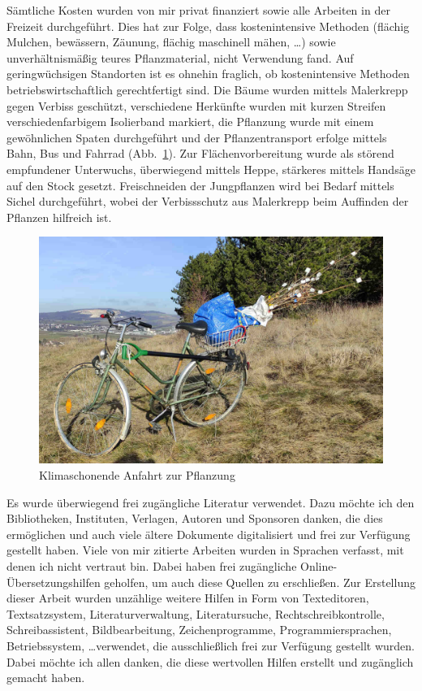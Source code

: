 \documentclass[twocolumn]{scrartcl}
\begin{document}
Sämtliche Kosten wurden von mir privat finanziert sowie alle Arbeiten
in der Freizeit durchgeführt. Dies hat zur Folge, dass kostenintensive
Methoden (flächig Mulchen, bewässern, Zäunung, flächig maschinell
mähen, \dots) sowie unverhältnismäßig teures Pflanzmaterial, nicht
Verwendung fand. Auf geringwüchsigen Standorten ist es ohnehin
fraglich, ob kostenintensive Methoden betriebswirtschaftlich
gerechtfertigt sind. Die Bäume wurden mittels Malerkrepp gegen Verbiss
geschützt, verschiedene Herkünfte wurden mit kurzen Streifen
verschiedenfarbigem Isolierband markiert, die Pflanzung wurde mit
einem gewöhnlichen Spaten durchgeführt und der Pflanzentransport
erfolge mittels Bahn, Bus und Fahrrad
(Abb.~\ref{fig:fahrradPflanzung}). Zur Flächenvorbereitung wurde als
störend empfundener Unterwuchs, überwiegend mittels Heppe, stärkeres
mittels Handsäge auf den Stock gesetzt. Freischneiden der Jungpflanzen
wird bei Bedarf mittels Sichel durchgeführt, wobei der Verbissschutz
aus Malerkrepp beim Auffinden der Pflanzen hilfreich ist.

\begin{figure}[htbp]
  \centering
  \includegraphics[width=.9\linewidth]{./bild/fahrradPflanzung}
  \caption{Klimaschonende Anfahrt zur Pflanzung}
  \label{fig:fahrradPflanzung}
\end{figure}

Es wurde überwiegend frei zugängliche Literatur verwendet. Dazu möchte ich den
Bibliotheken, Instituten, Verlagen, Autoren und Sponsoren danken, die dies
ermöglichen und auch viele ältere Dokumente digitalisiert und frei zur Verfügung
gestellt haben. Viele von mir zitierte Arbeiten wurden in Sprachen verfasst, mit
denen ich nicht vertraut bin. Dabei haben frei zugängliche
Online-Übersetzungshilfen geholfen, um auch diese Quellen zu erschließen. Zur
Erstellung dieser Arbeit wurden unzählige weitere Hilfen in Form von
Texteditoren, Textsatzsystem, Literaturverwaltung, Literatursuche,
Rechtschreibkontrolle, Schreibassistent, Bildbearbeitung, Zeichenprogramme,
Programmiersprachen, Betriebssystem, \dots verwendet, die ausschließlich frei
zur Verfügung gestellt wurden. Dabei möchte ich allen danken, die diese
wertvollen Hilfen erstellt und zugänglich gemacht haben.
\end{document}

